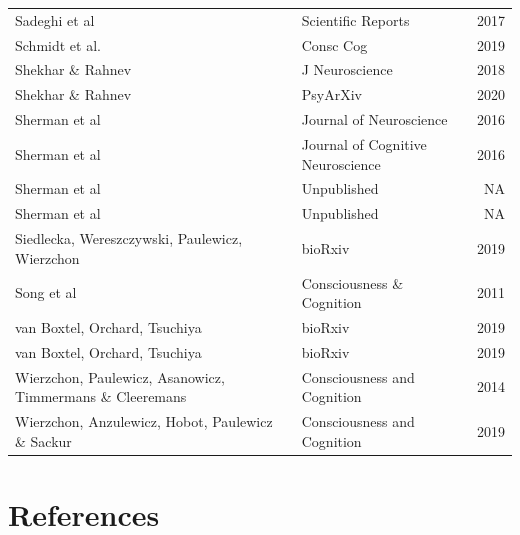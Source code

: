 \documentclass[
]{article}
\begin{document}
\begin{longtable}[t]{llr}
Sadeghi et al & Scientific Reports & 2017\\
Schmidt et al. & Consc Cog & 2019\\
Shekhar \& Rahnev & J Neuroscience & 2018\\
\addlinespace
Shekhar \& Rahnev & PsyArXiv & 2020\\
Sherman et al & Journal of Neuroscience & 2016\\
Sherman et al & Journal of Cognitive Neuroscience & 2016\\
Sherman et al & Unpublished & NA\\
Sherman et al & Unpublished & NA\\
\addlinespace
Siedlecka, Wereszczywski, Paulewicz, Wierzchon & bioRxiv & 2019\\
Song et al & Consciousness \& Cognition & 2011\\
van Boxtel, Orchard, Tsuchiya & bioRxiv & 2019\\
van Boxtel, Orchard, Tsuchiya & bioRxiv & 2019\\
Wierzchon, Paulewicz, Asanowicz, Timmermans \& Cleeremans & Consciousness and Cognition & 2014\\
\addlinespace
Wierzchon, Anzulewicz, Hobot, Paulewicz \& Sackur & Consciousness and Cognition & 2019\\*
\end{longtable}
\endgroup{}

\newpage

\hypertarget{references}{%
\section*{References}\label{references}}
\end{document}

